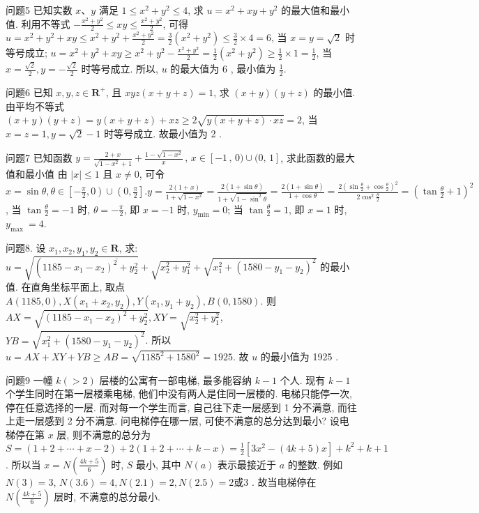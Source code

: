 问题5 已知实数 $x 、 y$ 满足 $1 \leqslant x^2+y^2 \leqslant 4$, 求 $u=x^2+x y+y^2$ 的最大值和最小值.
利用不等式 $-\frac{x^2+y^2}{2} \leqslant x y \leqslant \frac{x^2+y^2}{2}$, 可得 $u=x^2+y^2+x y \leqslant x^2+y^2+\frac{x^2+y^2}{2}=\frac{3}{2}\left(x^2+y^2\right) \leqslant \frac{3}{2} \times 4=6$, 当 $x=y=\sqrt{2}$ 时等号成立; $u=x^2+y^2+x y \geqslant x^2+y^2-\frac{x^2+y^2}{2}=\frac{1}{2}\left(x^2+y^2\right) \geqslant \frac{1}{2} \times 1=\frac{1}{2}$, 当 $x= \frac{\sqrt{2}}{2}, y=-\frac{\sqrt{2}}{2}$ 时等号成立.
所以, $u$ 的最大值为 6 , 最小值为 $\frac{1}{2}$.



问题6 已知 $x, y, z \in \mathbf{R}^{+}$, 且 $x y z(x+y+z)=1$, 求 $(x+y)(y+z)$ 的最小值.
由平均不等式 $(x+y)(y+z)=y(x+y+z)+x z \geqslant 2 \sqrt{y(x+y+z) \cdot x z}=2$, 当 $x=z=1, y=\sqrt{2}-1$ 时等号成立.
故最小值为 2 .



问题7 已知函数 $y={\frac{2+x}{{\sqrt{1-x^{2}}}+1}}+{\frac{1-{\sqrt{1-x^{2}}}}{x}}\,,\,x\in[-1\,,\,0)\cup(0,\,1]$, 求此函数的最大值和最小值
由 $|x| \leqslant 1$ 且 $x \neq 0$, 可令 $x=\sin \theta, \theta \in\left[-\frac{\pi}{2}, 0\right) \cup\left(0, \frac{\pi}{2}\right] . y= \frac{2(1+x)}{1+\sqrt{1-x^2}}=\frac{2(1+\sin \theta)}{1+\sqrt{1-\sin ^2 \theta}}=\frac{2(1+\sin \theta)}{1+\cos \theta}=\frac{2\left(\sin \frac{\theta}{2}+\cos \frac{\theta}{2}\right)^2}{2 \cos ^2 \frac{\theta}{2}}= \left(\tan \frac{\theta}{2}+1\right)^2$, 当 $\tan \frac{\theta}{2}=-1$ 时, $\theta=-\frac{\pi}{2}$, 即 $x=-1$ 时, $y_{\min }=0$; 当 $\tan \frac{\theta}{2}=1$, 即 $x=1$ 时, $y_{\text {max }}=4$.



问题8. 设 $x_1, x_2, y_1, y_2 \in \mathbf{R}$, 求:
$u=\sqrt{\left(1185-x_1-\overline{\left.x_2\right)^2+y_2^2}\right.}+\sqrt{x_2^2+y_1^2}+\sqrt{x_1^2+\left(1580-y_1-y_2\right)^2}$ 的最小值.
在直角坐标平面上, 取点 $A(1185,0), X\left(x_1+x_2, y_2\right), Y\left(x_1, y_1+\right. \left.y_2\right), B(0,1580)$. 则 $A X=\sqrt{\left(1185-x_1-x_2\right)^2+y_2^2}, X Y=\sqrt{x_2^2+y_1^2}$, $Y B=\sqrt{x_1^2+\left(1580-y_1-y_2\right)^2}$. 所以 $u=A X+X Y+Y B \geqslant A B= \sqrt{1185^2+1580^2}=1925$. 故 $u$ 的最小值为 1925 .



问题9 一幢 $k(>2)$ 层楼的公寓有一部电梯, 最多能容纳 $k-1$ 个人.
现有 $k-1$ 个学生同时在第一层楼乘电梯, 他们中没有两人是住同一层楼的.
电梯只能停一次,停在任意选择的一层.
而对每一个学生而言, 自己往下走一层感到 1 分不满意, 而往上走一层感到 2 分不满意.
问电梯停在哪一层, 可使不满意的总分达到最小?
设电梯停在第 $x$ 层, 则不满意的总分为 $S=(1+2+\cdots+x-2)+ 2(1+2+\cdots+k-x)=\frac{1}{2}\left[3 x^2-(4 k+5) x\right]+k^2+k+1$. 所以当 $x= N\left(\frac{4 k+5}{6}\right)$ 时, $S$ 最小, 其中 $N(a)$ 表示最接近于 $a$ 的整数.
例如 $N(3)=3$, $N(3.6)=4, N(2.1)=2, N(2.5)=2或 3$ . 故当电梯停在 $N\left(\frac{4 k+5}{6}\right)$ 层时, 不满意的总分最小.



